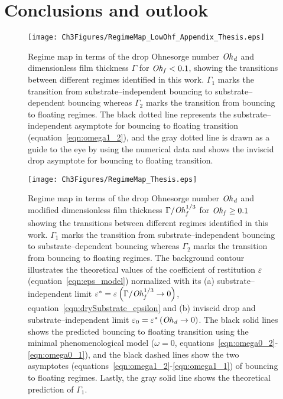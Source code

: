 \section{Conclusions and outlook}
\label{sec:Conclusions and Outlook}
\begin{figure}
	\centering
	\texttt{[image: Ch3Figures/RegimeMap\_LowOhf\_Appendix\_Thesis.eps]}
	\caption{Regime map in terms of the drop Ohnesorge number $\mathit{Oh}_\mathit{d}$ and dimensionless film thickness $\Gamma$ for $\mathit{Oh}_\mathit{f} < 0.1$, showing the transitions between different regimes identified in this work. $\Gamma_1$ marks the transition from substrate--independent bouncing to substrate--dependent bouncing whereas $\Gamma_2$ marks the transition from bouncing to floating regimes. The black dotted line represents the substrate--independent asymptote for bouncing to floating transition (equation~\eqref{eqn:omega1_2}), and the gray dotted line is drawn as a guide to the eye by using the numerical data and shows the inviscid drop asymptote for bouncing to floating transition.}
	\label{fig:LowOhfRegime}
\end{figure}
\begin{sidewaysfigure}
	\centering
	\texttt{[image: Ch3Figures/RegimeMap\_Thesis.eps]}
	\caption{Regime map in terms of the drop Ohnesorge number $\mathit{Oh}_\mathit{d}$ and modified dimensionless film thickness $\Gamma/\mathit{Oh}_\mathit{f}^{1/3}$ for $\mathit{Oh}_\mathit{f} \ge 0.1$ showing the transitions between different regimes identified in this work. $\Gamma_1$ marks the transition from substrate--independent bouncing to substrate--dependent bouncing whereas $\Gamma_2$ marks the transition from bouncing to floating regimes. The background contour illustrates the theoretical values of the coefficient of restitution $\varepsilon$ (equation~\eqref{eqn:eps_model}) normalized with its (a) substrate--independent limit $\varepsilon^* = \varepsilon\left(\Gamma/\mathit{Oh}_\mathit{f}^{1/3} \to 0\right)$, equation~\eqref{eqn:drySubstrate_epsilon} and (b) inviscid drop and substrate--independent limit $\varepsilon_0 = \varepsilon^*\left(\mathit{Oh}_\mathit{d} \to 0\right)$. The black solid lines shows the predicted bouncing to floating transition using the minimal phenomenological model ($\omega = 0$, equations~\eqref{eqn:omega0_2}-\eqref{eqn:omega0_1}), and the black dashed lines show the two asymptotes (equations~\eqref{eqn:omega1_2}-\eqref{eqn:omega1_1}) of bouncing to floating regimes. Lastly, the gray solid line shows the theoretical prediction of $\Gamma_1$.}
	\label{fig:regimeMap}
\end{sidewaysfigure}

